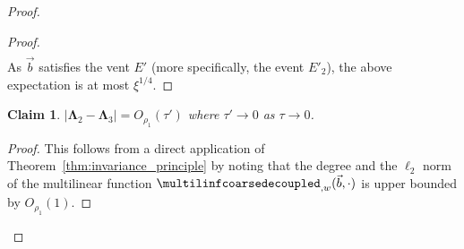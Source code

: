 \documentclass[11pt]{article}
\newtheorem{claim}[thm]{Claim}
\newcommand\card[1]{\left| {#1} \right|}
\newcommand{\V}[1]{{#1}}
\begin{document}
\begin{proof}
\begin{proof}
\begin{align*}
    \end{align*}
    As $\vec{b}$ satisfies the vent $E'$ (more specifically, the event $E'_2$), the above expectation is at most $\xi^{1/4}$.
   \end{proof}
   \begin{claim}\label{claim:inv_gaussian} $\card {\mathbf{\Lambda}_2 - \mathbf{\Lambda}_3} = O_{\rho_1}(\tau')$ where $\tau'\rightarrow 0 $ as $\tau \rightarrow 0$. 
   \end{claim}
   \begin{proof}
       This follows from a direct application of Theorem~\ref{thm:invariance_principle} by noting that the degree and the $\ell_2$ norm of the multilinear function $\multilinfcoarsedecoupled_{,\V w}(\vec{b}, \cdot)$ is upper bounded by $O_{\rho_1}(1)$.
   \end{proof}


  
   

\end{proof}
\end{document}
